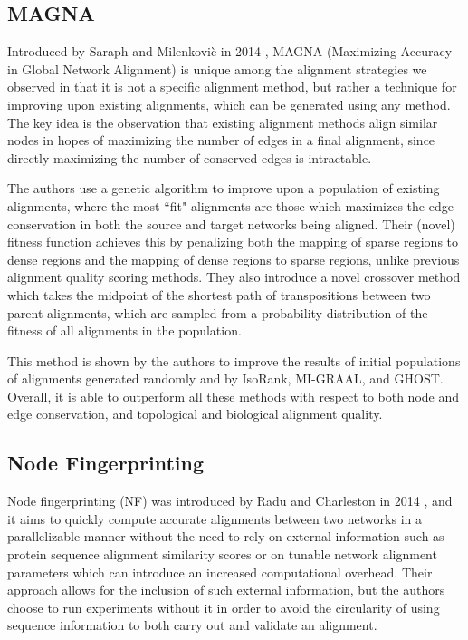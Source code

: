 \documentclass[12pt]{thesis}
\theoremstyle{plain}
\theoremstyle{definition}
\theoremstyle{remark}
\begin{document}
\subsection{MAGNA}

Introduced by Saraph and Milenkovi\`{c} in 2014 \cite{Saraph_2014}, MAGNA (Maximizing Accuracy in Global Network Alignment) is unique among the alignment strategies we observed in that it is not a specific alignment method, but rather a technique for improving upon existing alignments, which can be generated using any method. The key idea is the observation that existing alignment methods align similar nodes in hopes of maximizing the number of edges in a final alignment, since directly maximizing the number of conserved edges is intractable. 

The authors use a genetic algorithm to improve upon a population of existing alignments, where the most ``fit" alignments are those which maximizes the edge conservation in both the source and target networks being aligned. Their (novel) fitness function achieves this by penalizing both the mapping of sparse regions to dense regions and the mapping of dense regions to sparse regions, unlike previous alignment quality scoring methods. They also introduce a novel crossover method which takes the midpoint of the shortest path of transpositions between two parent alignments, which are sampled from a probability distribution of the fitness of all alignments in the population.

This method is shown by the authors to improve the results of initial populations of alignments generated randomly and by IsoRank, MI-GRAAL, and GHOST. Overall, it is able to outperform all these methods with respect to both node and edge conservation, and topological and biological alignment quality.

\subsection{Node Fingerprinting}

Node fingerprinting (NF) was introduced by Radu and Charleston in 2014 \cite{radu2014node}, and it aims to quickly compute accurate alignments between two networks in a parallelizable manner without the need to rely on external information such as protein sequence alignment similarity scores or on tunable network alignment parameters which can introduce an increased computational overhead. Their approach allows for the inclusion of such external information, but the authors choose to run experiments without it in order to avoid the circularity of using sequence information to both carry out and validate an alignment.
\end{document}
